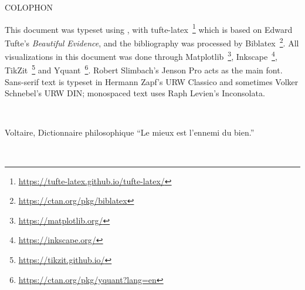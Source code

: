 
\pagestyle{empty}
{
    \mbox{}
    \vfill
    \noindent COLOPHON
    \vspace{10pt}

    \noindent
	This document was typeset using \XeTeX, with tufte-latex~\footnote{\url{https://tufte-latex.github.io/tufte-latex/}} which is based on Edward Tufte's \emph{Beautiful Evidence}, and the bibliography was processed by Biblatex~\footnote{\url{https://ctan.org/pkg/biblatex}}. All visualizations in this document was done through Matplotlib~\footnote{\url{https://matplotlib.org/}}, Inkscape~\footnote{\url{https://inkscape.org/}}, TikZit~\footnote{\url{https://tikzit.github.io/}} and Yquant~\footnote{\url{https://ctan.org/pkg/yquant?lang=en}}. Robert Slimbach’s Jenson Pro acts as the main font. Sans-serif text is typeset in Hermann Zapf's {\sansfont\selectfont URW Classico} and sometimes Volker Schnebel's  {\figurefont\selectfont URW DIN}; monospaced text uses Raph Levien's {\monofont\selectfont Inconsolata}.

    \mbox{}
    \vfill

    \begin{minipage}{\textwidth}
        \begin{FlushRight}
        \end{FlushRight}
    \end{minipage}

	\mbox{}
    \vfill
}

\clearpage

\pagestyle{empty}
\begin{fullwidth}
    ~\vfill
    \begin{center}
        \large
        \begin{minipage}{0.5\linewidth}
            \begin{epigram}{Voltaire, Dictionnaire philosophique}
                \enquote{Le mieux est l'ennemi du bien.}
            \end{epigram}
        \end{minipage}
    \end{center}
    ~\vfill
\end{fullwidth}
